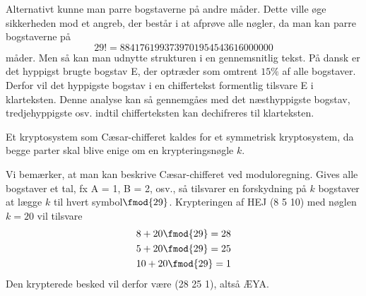 Alternativt kunne man parre bogstaverne på andre måder. Dette ville øge sikkerheden mod et angreb, der består i at afprøve alle nøgler, da man kan parre bogstaverne på 
\[
29! = 8841761993739701954543616000000
\]
måder. Men så kan man udnytte strukturen i en gennemsnitlig tekst. På dansk er det hyppigst brugte bogstav E, der optræder som omtrent $15\%$ af alle bogstaver. Derfor vil det hyppigste bogstav i en chiffertekst formentlig tilsvare E i klarteksten. Denne analyse kan så gennemgåes med det næsthyppigste bogstav, tredjehyppigste osv. indtil chifferteksten kan dechifreres til klarteksten. 

Et kryptosystem som Cæsar-chifferet kaldes for et symmetrisk kryptosystem, da begge parter skal blive enige om en krypteringsnøgle $k$. 

Vi bemærker, at man kan beskrive Cæsar-chifferet ved moduloregning. Gives alle bogstaver et tal, fx A = 1, B = 2, osv., så tilsvarer en forskydning på $k$ bogstaver at lægge $k$ til hvert symbol$\fmod{29}$. Krypteringen af HEJ (8 5 10) med nøglen $k = 20$ vil tilsvare
\begin{align*}
	&8 + 20 \fmod{29} = 28\\
	&5 + 20 \fmod{29} = 25\\
	&10 + 20 \fmod{29} = 1\\
\end{align*}
Den krypterede besked vil derfor være (28 25 1), altså ÆYA.

